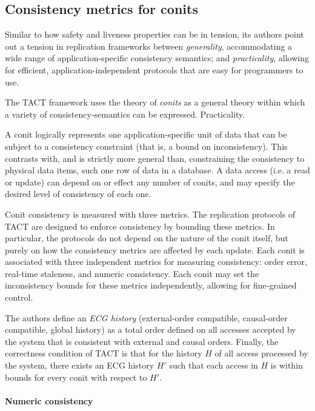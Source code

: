 \subsection{Consistency metrics for conits}

Similar to how safety and liveness properties can be in tension, its
authors point out a tension in replication frameworks between
\emph{generality}, accommodating a wide range of application-specific
consistency semantics; and \emph{practicality}, allowing for
efficient, application-independent protocols that are easy for
programmers to use.

The TACT framework uses the theory of
\emph{conits} as a general theory within which a variety of
consistency-semantics can be expressed. Practicality.

A conit logically represents one application-specific unit of data
that can be subject to a consistency constraint (that is, a bound on
inconsistency). This contrasts with, and is strictly more general
than, constraining the consistency to physical data items, such one
row of data in a database. A data access (i.e. a read or update) can
depend on or effect any number of conits, and may specify the desired
level of consistency of each one.

Conit consistency is measured with three metrics. The replication
protocols of TACT are designed to enforce consistency by bounding
these metrics. In particular, the protocols do not depend on the
nature of the conit itself, but purely on how the consistency metrics
are affected by each update. Each conit is associated with three
independent metrics for measuring consistency: order error, real-time
staleness, and numeric consistency. Each conit may set the
inconsistency bounds for these metrics independently, allowing for
fine-grained control.

The authors define an \emph{ECG history} (external-order compatible,
causal-order compatible, global history) as a total order defined on
all accesses accepted by the system that is consistent with external
and causal orders. Finally, the correctness condition of TACT is that
for the history $H$ of all access processed by the system, there
exists an ECG history $H'$ such that each access in $H$ is within
bounds for every conit with respect to $H'$.

\paragraph{Numeric consistency}

